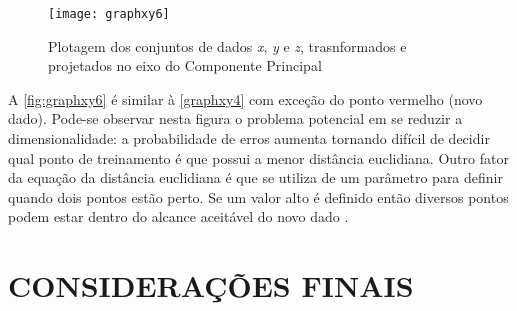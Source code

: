 \begin{figure}[h]
	\centering
	\texttt{[image: graphxy6]}
	\caption{Plotagem dos conjuntos de dados \textit{x}, \textit{y} e \textit{z}, trasnformados e projetados no eixo do Componente Principal}
	\label{fig:graphxy6}
\end{figure}

A \autoref{fig:graphxy6} é similar à \autoref{graphxy4} com exceção do ponto vermelho (novo dado). Pode-se observar nesta figura o problema potencial em se reduzir a dimensionalidade: a probabilidade de erros aumenta tornando difícil de decidir qual ponto de treinamento é que possui a menor distância euclidiana. Outro fator da equação da distância euclidiana é que se utiliza de um parâmetro para definir quando dois pontos estão perto. Se um valor alto é definido então diversos pontos podem estar dentro do alcance aceitável do novo dado \cite{drmathew_java_programming}.



\section{CONSIDERAÇÕES FINAIS}\label{sec:revbib_consid_finais}






















